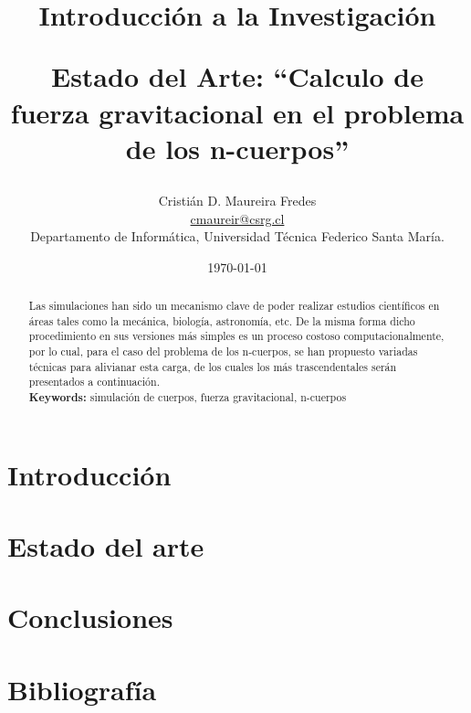 \documentclass[letter, 10pt]{IEEEtran}
\begin{document}

\pagestyle{empty}

\title{Introducción a la Investigación\\ \begin{Large}Estado del Arte: ``Calculo de fuerza gravitacional en el problema de los n-cuerpos''\end{Large}}
\author{Cristián D. Maureira Fredes\\\url{cmaureir@csrg.cl}\\Departamento de Informática, Universidad Técnica Federico Santa María.}
\date{\today}

\maketitle
\begin{abstract}
Las simulaciones han sido un mecanismo clave de poder realizar estudios científicos
en áreas tales como la mecánica, biología, astronomía, etc. De la misma forma
dicho procedimiento en sus versiones más simples es un proceso costoso
computacionalmente, por lo cual, para el caso del problema de los n-cuerpos,
se han propuesto variadas técnicas para alivianar esta carga, de los cuales
los más trascendentales serán presentados a continuación.\\
{\bf Keywords: } simulación de cuerpos, fuerza gravitacional, n-cuerpos
\end{abstract}

\section{Introducción}
\label{sec:introduccion}


\section{Estado del arte}
\label{sec:estado_arte}


\section{Conclusiones}
\label{sec:conclusiones}


\section{Bibliografía}

\end{document}
